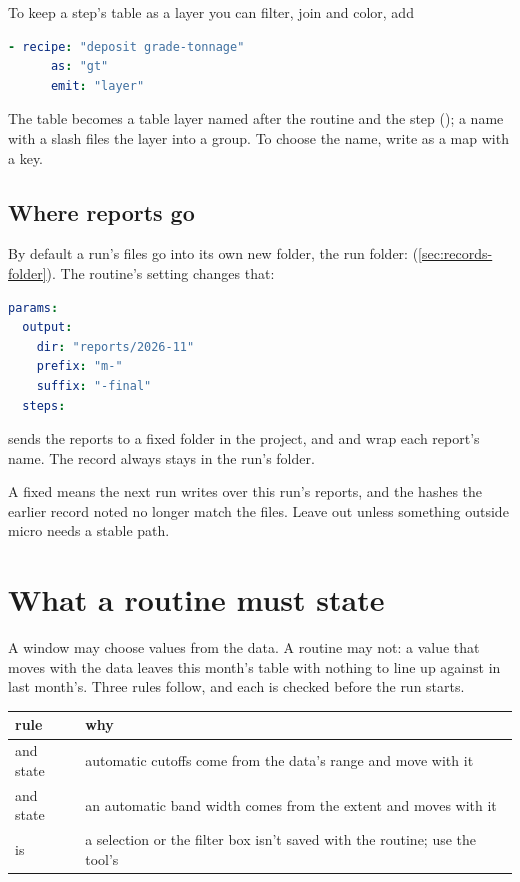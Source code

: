 To keep a step's table as a layer you can filter, join and color, add 

\begin{lstlisting}[language=yaml]
    - recipe: "deposit grade-tonnage"
      as: "gt"
      emit: "layer"
\end{lstlisting}

The table becomes a table layer named after the routine and the step (); a name with a slash files the layer into a group. To choose the name, write  as a map with a  key.

\subsection{Where reports go}
By default a run's files go into its own new folder, the run folder:  (\cref{sec:records-folder}). The routine's  setting changes that:

\begin{lstlisting}[language=yaml]
params:
  output:
    dir: "reports/2026-11"
    prefix: "m-"
    suffix: "-final"
  steps:
\end{lstlisting}

 sends the reports to a fixed folder in the project, and  and  wrap each report's name. The record  always stays in the run's folder.

\begin{caution}
A fixed  means the next run writes over this run's reports, and the hashes the earlier record noted no longer match the files. Leave  out unless something outside micro needs a stable path.
\end{caution}

\section{What a routine must state}\label{sec:routines-rules}
A window may choose values from the data. A routine may not: a value that moves with the data leaves this month's table with nothing to line up against in last month's. Three rules follow, and each is checked before the run starts.

\begin{tabularx}{\linewidth}{@{}lL@{}}\toprule
rule & why \\ \midrule
{} and  state  & automatic cutoffs come from the data's range and move with it \\
 and  state  & an automatic band width comes from the extent and moves with it \\
 is  & a selection or the filter box isn't saved with the routine; use the tool's  \\
\bottomrule
\end{tabularx}

